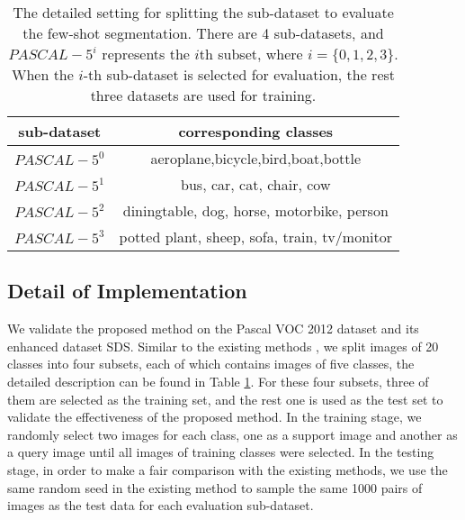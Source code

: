 \documentclass[runningheads]{llncs}
\begin{document}
\begin{table}[h]
        \centering
        \caption{The detailed setting for splitting the sub-dataset to evaluate the few-shot segmentation. There are 4 sub-datasets, and $PASCAL-5^i$ represents the $i$th subset, where $i=\{0, 1, 2, 3\}$. When the $i$-th sub-dataset is selected for evaluation, the rest three datasets are used for training.}
        \label{table_subdataset}
        \begin{tabular}{|c|c|}
                \hline
                sub-dataset&corresponding classes\\
                \hline
                $PASCAL-5^0$&aeroplane,bicycle,bird,boat,bottle\\
                $PASCAL-5^1$&bus, car, cat, chair, cow\\
                $PASCAL-5^2$&diningtable, dog, horse, motorbike, person\\
                $PASCAL-5^3$&potted plant, sheep, sofa, train, tv/monitor\\
                \hline
        \end{tabular}
\end{table}

\subsection{Detail of Implementation}
We validate the proposed method on the Pascal VOC 2012\cite{ref_voc} dataset and its enhanced dataset SDS\cite{ref_sds}. Similar to the existing methods \cite{ref_first_one,ref_conditional,ref_sgone,ref_aaai,ref_cvpr}, we split images of 20 classes into four subsets, each of which contains images of five classes, the detailed description can be found in Table \ref{table_subdataset}. For these four subsets, three of them are selected as the training set, and the rest one is used as the test set to validate the effectiveness of the proposed method. In the training stage, we randomly select two images for each class, one as a support image and another as a query image until all images of training classes were selected. In the testing stage, in order to make a fair comparison with the existing methods, we use the same random seed in the existing method to sample the same 1000 pairs of images as the test data for each evaluation sub-dataset.
\end{document}
